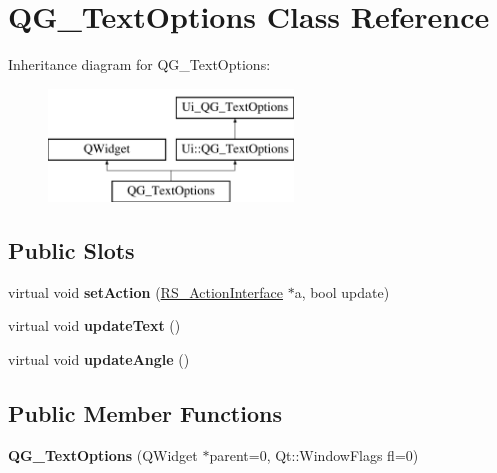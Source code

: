 \hypertarget{classQG__TextOptions}{\section{Q\-G\-\_\-\-Text\-Options Class Reference}
\label{classQG__TextOptions}
}
Inheritance diagram for Q\-G\-\_\-\-Text\-Options\-:\begin{figure}[H]
\begin{center}
\leavevmode
\includegraphics[height=3.000000cm]{classQG__TextOptions}
\end{center}
\end{figure}
\subsection*{Public Slots}
\begin{DoxyCompactItemize}
\item 
\hypertarget{classQG__TextOptions_a2445563d69328c51b9505f489404e7f1}{virtual void {\bfseries set\-Action} (\hyperlink{classRS__ActionInterface}{R\-S\-\_\-\-Action\-Interface} $\ast$a, bool update)}\label{classQG__TextOptions_a2445563d69328c51b9505f489404e7f1}

\item 
\hypertarget{classQG__TextOptions_a0af90e7fdfb5d5dd6285d173fcf08915}{virtual void {\bfseries update\-Text} ()}\label{classQG__TextOptions_a0af90e7fdfb5d5dd6285d173fcf08915}

\item 
\hypertarget{classQG__TextOptions_a7faf05ef2839824f40123e245a4acbcb}{virtual void {\bfseries update\-Angle} ()}\label{classQG__TextOptions_a7faf05ef2839824f40123e245a4acbcb}

\end{DoxyCompactItemize}
\subsection*{Public Member Functions}
\begin{DoxyCompactItemize}
\item 
\hypertarget{classQG__TextOptions_a4ce112c0a18d1e29e97e437317e70426}{{\bfseries Q\-G\-\_\-\-Text\-Options} (Q\-Widget $\ast$parent=0, Qt\-::\-Window\-Flags fl=0)}\label{classQG__TextOptions_a4ce112c0a18d1e29e97e437317e70426}

\end{DoxyCompactItemize}
